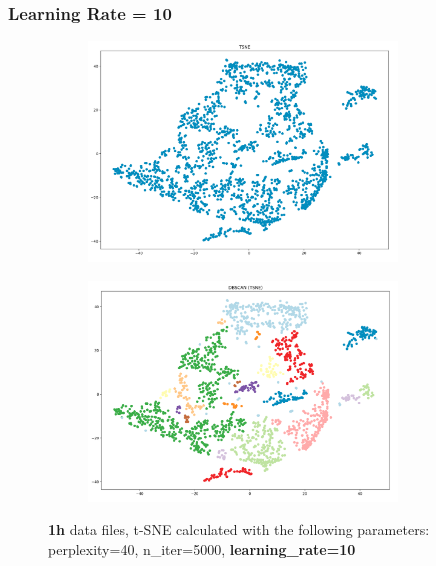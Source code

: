 

\subsubsection{Learning Rate = 10}
\begin{figure}[H]
  \centering
  \begin{subfigure}{.5\textwidth}
    \centering
    \includegraphics[width=0.9\textwidth]{./images/tsneParametersTest/learningRate/lr10-1hTSNE.png}
  \end{subfigure}%
  \begin{subfigure}{.5\textwidth}
    \centering
    \includegraphics[width=0.9\textwidth]{./images/tsneParametersTest/learningRate/lr10-1hDBSCAN.png}
  \end{subfigure}
	\caption{\textbf{1h} data files, t-SNE calculated with the following parameters: perplexity=40, n\_iter=5000, \textbf{learning\_rate=10}}
	\label{figure:1hlr10TSNE}
\end{figure}

